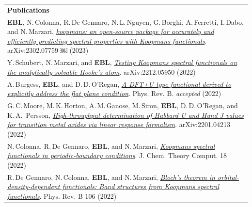 \documentclass[10pt,a4paper,final]{article}
\begin{document}
\begin{tabularx}{\textwidth}{
   X}
   \rowcolor{seaborn_blue}
      \large\textcolor{seaborn_bg_grey_half}{\textbf{Publications}} \\
   \textbf{EBL}, N.\,Colonna, R.\,De Gennaro, N.\,L.\,Nguyen, G.\,Borghi, A.\,Ferretti, I.\,Dabo, and N.\,Marzari, \href{https://arxiv.org/abs/2302.07759}{\textit{koopmans: an open-source package for accurately and efficiently predicting spectral properties with Koopmans functionals}}. arXiv:2302.07759
￼
 (2023)
   \\
   Y.\,Schubert, N.\,Marzari, and \textbf{EBL}, \href{https://arxiv.org/abs/2212.05950}{\textit{Testing Koopmans spectral functionals on the analytically-solvable Hooke's atom}}. arXiv:2212.05950 (2022)
   \\
   A.\,Burgess, \textbf{EBL}, and D.\,D.\,O'Regan, \href{https://arxiv.org/abs/2210.17404}{\textit{A DFT+U type functional derived to explicitly address the flat plane condition}}. Phys. Rev. B. \emph{accepted} (2022)
   \\
   G.\,C.\,Moore, M.\,K.\,Horton, A.\,M.\,Ganose, M.\,Siron, \textbf{EBL}, D.\,D.\,O'Regan, and K.\,A.\, Persson, \href{https://arxiv.org/abs/2201.04213}{\textit{High-throughput determination of Hubbard U and Hund J values for transition metal oxides via linear response formalism}}. arXiv:2201.04213 (2022) \\
   N.\,Colonna, R.\,De Gennaro, \textbf{EBL}, and N.\,Marzari, \href{https://pubs.acs.org/doi/10.1021/acs.jctc.2c00161}{\textit{Koopmans spectral functionals in periodic-boundary conditions}}. J. Chem. Theory Comput. 18 (2022)                                                                                                                                                                                                                                                                                                                                                                                                                                                                                                                                                                 \\ %
   R.\,De Gennaro, N.\,Colonna, \textbf{EBL}, and N.\,Marzari, \href{https://doi.org/10.1103/PhysRevB.106.035106}{\textit{Bloch's theorem in orbital-density-dependent functionals: Band structures from Koopmans spectral functionals}}. Phys. Rev. B 106 (2022)                                                                                                                                                                                                                                                                                                                                                                                                                                                                                                      \\ %

\end{tabularx}
\end{document}
